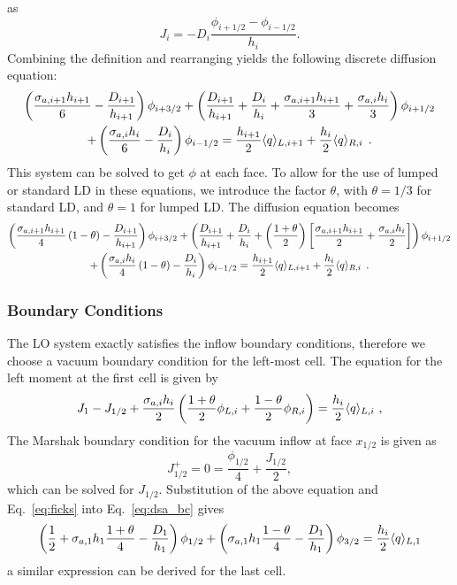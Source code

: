 as \begin{equation}\label{eq:ficks}
    J_{i} = -D_i \frac{\phi_{i+1/2} - \phi_{i-1/2}}{h_i}.
\end{equation}
Combining the definition and rearranging yields the following discrete diffusion
equation:
\begin{multline}
        \left(\frac{\sigma_{a,i+1} h_{i+1}}{6} -
        \frac{D_{i+1}}{h_{i+1}}\right)\phi_{i+3/2} + \left(\frac{D_{i+1}}{h_{i+1}} +
        \frac{D_{i}}{h_i} + \frac{\sigma_{a,i+1} h_{i+1}}{3} + \frac{\sigma_{a,i}
        h_{i}}{3}\right)\phi_{i+1/2} \\ + \left(\frac{\sigma_{a,i} h_{i}}{6} -
        \frac{D_{i}}{h_{i}}\right)\phi_{i-1/2} = \frac{h_{i+1}}{2} \langle q \rangle_{L,i+1} +
        \frac{h_{i}}{2}\langle q \rangle_{R,i}\;\,. 
\end{multline}
This system can be solved to get $\phi$ at each face.  To allow for the use of lumped
or standard LD in these equations, we introduce the factor $\theta$, with
$\theta=1/3$ for standard
LD, and $\theta=1$ for lumped LD.  The diffusion equation becomes
\begin{multline}
    \left(\frac{\sigma_{a,i+1} h_{i+1}}{4}\left(1 - \theta\right)  -
        \frac{D_{i+1}}{h_{i+1}}\right)\phi_{i+3/2} + \left(\frac{D_{i+1}}{h_{i+1}} +
        \frac{D_{i}}{h_i} + \left(\frac{1+\theta}{2} \right)\left[\frac{\sigma_{a,i+1} h_{i+1}}{2} + \frac{\sigma_{a,i}
        h_{i}}{2}\right]\right)\phi_{i+1/2} \\ + \left(\frac{\sigma_{a,i}
        h_{i}}{4}\left(1 - \theta\right) -
        \frac{D_{i}}{h_{i}}\right)\phi_{i-1/2} = \frac{h_{i+1}}{2} \langle q \rangle_{L,i+1} +
        \frac{h_{i}}{2}\langle q \rangle_{R,i}
        \;\,. 
\end{multline}

\subsubsection{Boundary Conditions}

The LO system exactly satisfies the inflow boundary conditions, therefore we choose a
vacuum boundary condition for the left-most cell.  The equation for the left moment
at the first cell is given by
\begin{equation}\label{eq:dsa_bc}
    J_{1} - J_{1/2}  + \frac{\sigma_{a,i}h_i}{2} \left(\frac{1+\theta}{2} \phi_{L,i}
    + \frac{1-\theta}{2}
    \phi_{R,i} \right) = \frac{h_i}{2} \langle q \rangle_{L,i}\,\,,
\end{equation}
The Marshak boundary condition for the vacuum inflow at face $x_{1/2}$ is given as
\begin{equation}
    J^+_{1/2} = 0 = \frac{\phi_{1/2}}{4} + \frac{J_{1/2}}{2},
\end{equation}
which can be solved for $J_{1/2}$.  Substitution of the above equation and
Eq.~\eqref{eq:ficks} into Eq.~\eqref{eq:dsa_bc} gives 
\begin{equation}
    \left(\frac{1}{2}+ \sigma_{a,1}h_1\frac{1+\theta}{4} - \frac{D_1}{h_1}\right)\phi_{1/2} +
    \left( {\sigma_{a,1}{h_1}}\frac{1-\theta}{4} - \frac{D_1}{h_1}  \right)\phi_{3/2} =
    \frac{h_i}{2} \langle q \rangle_{L,1}
\end{equation}
a similar expression can be derived for the last cell.


